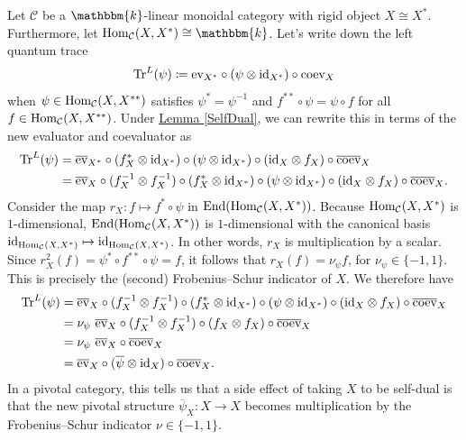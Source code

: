 \noindent\begin{remark}\label{DimensionFrobeniusSchur} Let $\mathcal{C}$ be a $\mathbbm{k}$-linear monoidal category with rigid object $X \cong X^*$. Furthermore, let $\homset_\mathcal{C}(X, X^*) \cong \mathbbm{k}$. Let's write down the left quantum trace
\begin{align*}
\begin{split}
\textup{Tr}^L(\psi) \coloneqq \textup{ev}_{X^{*}} \circ (\psi \otimes \textup{id}_{X^{*}}) \circ \textup{coev}_X
\end{split}
\end{align*}
\noindent when $\psi \in \textup{Hom}_\mathcal{C}(X, X^{**})$ satisfies $\psi^* = \psi^{-1}$ and $f^{**} \circ \psi = \psi \circ f$ for all $f \in \textup{Hom}_\mathcal{C}(X, X^{**})$. Under \hyperref[SelfDual]{Lemma \ref*{SelfDual}}, we can rewrite this in terms of the new evaluator and coevaluator as
\begin{align*}
\begin{split}
\textup{Tr}^L(\psi) &= \overline{\textup{ev}}_{X^{*}} \circ (f_X^* \otimes \textup{id}_{X^*}) \circ (\psi \otimes \textup{id}_{X^{*}}) \circ (\textup{id}_X \otimes f_X) \circ \overline{\textup{coev}}_X\\
&= \overline{\textup{ev}}_X \circ (f_X^{-1} \otimes f_X^{-1}) \circ (f_X^* \otimes \textup{id}_{X^*}) \circ (\psi \otimes \textup{id}_{X^{*}}) \circ (\textup{id}_X \otimes f_X) \circ \overline{\textup{coev}}_X.
\end{split}
\end{align*}
\noindent Consider the map $r_X : f \mapsto f^* \circ \psi$ in $\textup{End}(\textup{Hom}_\mathcal{C}(X, X^*))$. Because $\textup{Hom}_\mathcal{C}(X, X^*)$ is $1$-dimensional, $\textup{End}(\textup{Hom}_\mathcal{C}(X, X^*))$ is $1$-dimensional with the canonical basis $\textup{id}_{\textup{Hom}_\mathcal{C}(X, X^*)} \mapsto \textup{id}_{\textup{Hom}_\mathcal{C}(X, X^*)}$. In other words, $r_X$ is multiplication by a scalar. Since $r_X^2(f) = \psi^* \circ f^{**} \circ \psi = f$, it follows that $r_X(f) = \nu_\psi f$, for $\nu_\psi \in \{-1, 1\}$. This is precisely the (second) Frobenius--Schur indicator of $X$. We therefore have
\begin{align*}
\begin{split}
\textup{Tr}^L(\psi) &= \overline{\textup{ev}}_X \circ (f_X^{-1} \otimes f_X^{-1}) \circ (f_X^* \otimes \textup{id}_{X^*}) \circ (\psi \otimes \textup{id}_{X^{*}}) \circ (\textup{id}_X \otimes f_X) \circ \overline{\textup{coev}}_X\\
&= \nu_\psi\ \overline{\textup{ev}}_X \circ (f_X^{-1} \otimes f_X^{-1}) \circ (f_X \otimes f_X) \circ \overline{\textup{coev}}_X\\
&= \nu_\psi\ \overline{\textup{ev}}_X \circ \overline{\textup{coev}}_X\\
&= \overline{\textup{ev}}_X \circ (\overline{\psi} \otimes \textup{id}_X) \circ \overline{\textup{coev}}_X.
\end{split}
\end{align*}
\noindent In a pivotal category, this tells us that a side effect of taking $X$ to be self-dual is that the new pivotal structure $\overline{\psi}_X : X \to X$ becomes multiplication by the Frobenius--Schur indicator $\nu \in \{-1, 1\}$.\\
\end{remark}


